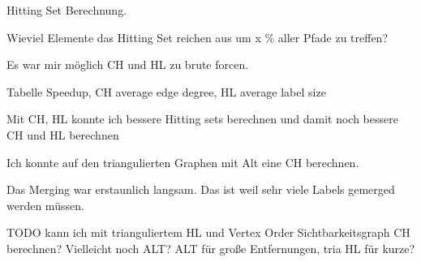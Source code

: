 Hitting Set Berechnung.


Wieviel Elemente das Hitting Set reichen aus um x \% aller Pfade zu treffen?


Es war mir möglich CH und HL zu brute forcen.

Tabelle Speedup, CH average edge degree, HL average label size

Mit CH, HL konnte ich bessere Hitting sets berechnen und damit noch bessere CH und HL  berechnen



Ich konnte auf den triangulierten Graphen mit Alt eine CH berechnen.



Das Merging war erstaunlich langsam. Das ist weil sehr viele Labels gemerged werden müssen.


TODO kann ich mit trianguliertem HL und Vertex Order Sichtbarkeitsgraph CH berechnen?
Vielleicht noch ALT? ALT für große Entfernungen, tria HL für kurze?